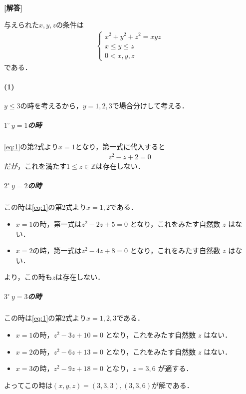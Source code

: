 \documentclass[../../main.tex]{subfiles}
\begin{document}
\begin{oframed}
  
\end{oframed}

{\bf [解答]}

与えられた$x,y,z$の条件は
\begin{align}
  \begin{cases}
    x^2+y^2+z^2 = xyz \\
    x \le y \le z \\
    0<x,y,z
  \end{cases} \label{eq:1}
\end{align}
である．

\paragraph{(1)}

$y\le 3$の時を考えるから，$y=1,2,3$で場合分けして考える．

\subparagraph{$1^\circ \ y=1$の時}

\cref{eq:1}の第2式より$x=1$となり，第一式に代入すると
\begin{align}
  z^2 -z + 2 = 0
\end{align}
だが，これを満たす$1 \le z\in \mathbb{Z}$は存在しない．

\subparagraph{$2^\circ \ y=2$の時}

この時は\cref{eq:1}の第2式より$x=1,2$である．
\begin{itemize}
  \item $x=1$の時，第一式は$z^2 - 2z + 5 = 0$ となり，これをみたす自然数 $z$ はない．\\
  \item $x=2$の時，第一式は$z^2 - 4z + 8 = 0$ となり，これをみたす自然数 $z$ はない．
\end{itemize}
より，この時も$z$は存在しない．

\subparagraph{$3^\circ \ y=3$の時}

この時は\cref{eq:1}の第2式より$x=1,2,3$である．
\begin{itemize}
  \item $x=1$の時，$z^2 - 3z + 10 = 0$ となり，これをみたす自然数 $z$ はない．\\
  \item $x=2$の時，$z^2 - 6z + 13 = 0$ となり，これをみたす自然数 $z$ はない．\\
  \item $x=3$の時，$z^2 - 9z + 18 = 0$ となり，$z=3, 6$ が適する．
\end{itemize}
よってこの時は$(x,y,z)=(3, 3, 3), (3, 3, 6)$が解である．
\casesend
\end{document}
